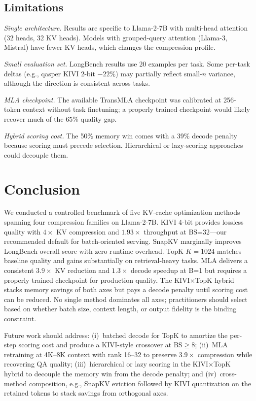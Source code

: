 \documentclass[conference]{IEEEtran}
\begin{document}
\subsection{Limitations}

\emph{Single architecture.}  Results are specific to Llama-2-7B with
multi-head attention (32 heads, 32 KV heads).  Models with grouped-query
attention (Llama-3, Mistral) have fewer KV heads, which changes the
compression profile.

\emph{Small evaluation set.}  LongBench results use 20 examples per
task.  Some per-task deltas (e.g., qasper KIVI 2-bit $-22\%$) may
partially reflect small-$n$ variance, although the direction is
consistent across tasks.

\emph{MLA checkpoint.}  The available TransMLA checkpoint was
calibrated at 256-token context without task finetuning; a properly
trained checkpoint would likely recover much of the 65\% quality gap.

\emph{Hybrid scoring cost.}  The 50\% memory win comes with a 39\%
decode penalty because scoring must precede selection.  Hierarchical
or lazy-scoring approaches could decouple them.

\section{Conclusion}

We conducted a controlled benchmark of five KV-cache optimization
methods spanning four compression families on Llama-2-7B.  KIVI 4-bit
provides lossless quality with $4\times$ KV compression and
$1.93\times$ throughput at BS=32---our recommended default for
batch-oriented serving.  SnapKV marginally improves LongBench overall
score with zero runtime overhead.  TopK $K\!=\!1024$ matches baseline
quality and gains substantially on retrieval-heavy tasks.  MLA delivers
a consistent $3.9\times$ KV reduction and $1.3\times$ decode speedup at
B=1 but requires a properly trained checkpoint for production quality.
The KIVI$\times$TopK hybrid stacks memory savings of both axes but pays
a decode penalty until scoring cost can be reduced.  No single method
dominates all axes; practitioners should select based on whether batch
size, context length, or output fidelity is the binding constraint.

Future work should address: (i)~batched decode for TopK to amortize the
per-step scoring cost and produce a KIVI-style crossover at
BS$\geq$8; (ii)~MLA retraining at 4K--8K context with rank 16--32 to
preserve $3.9\times$ compression while recovering QA quality;
(iii)~hierarchical or lazy scoring in the KIVI$\times$TopK hybrid to
decouple the memory win from the decode penalty; and (iv)~cross-method
composition, e.g., SnapKV eviction followed by KIVI quantization on the
retained tokens to stack savings from orthogonal axes.
\end{document}
